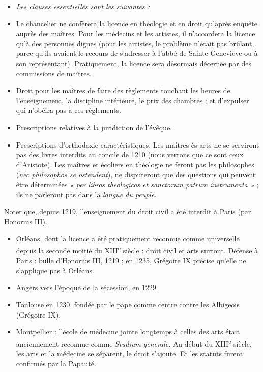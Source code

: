 \documentclass[french,twoside]{book} %
\newlength{\listmod}
\newcommand{\listhead}[1]{\hspace{-1\listmod}\emph{#1}}
\begin{document}
\begin{itemize}[itemsep=0pt,]
\item[]\listhead{Les clauses essentielles sont les suivantes :}
\item Le chancelier ne confèrera la licence en théologie et en droit qu’après enquête auprès des maîtres. Pour les médecins et les artistes, il n’accordera la licence qu’à des personnes dignes (pour les artistes, le problème n’était pas brûlant, parce qu’ils avaient le recours de s’adresser à l’abbé de Sainte-Geneviève ou à son représentant). Pratiquement, la licence sera désormais décernée par des commissions de maîtres.
\item Droit pour les maîtres de faire des règlements touchant les heures de l’enseignement, la discipline intérieure, le prix des chambres ; et d’expulser qui n’obéira pas à ces règlements.
\item Prescriptions relatives à la juridiction de l’évêque.
\item Prescriptions d’orthodoxie caractéristiques. Les maîtres ès arts ne se serviront pas des livres interdits au concile de 1210 (nous verrons que ce sont ceux d’Aristote). Les maîtres et écoliers en théologie ne feront pas les philosophes ({\itshape nec philosophos se ostendent}), ne disputeront que des questions qui peuvent être déterminées \emph{« per libros theologicos et sanctorum patrum instrumenta »} ; ils ne parleront pas dans la \emph{langue du peuple}.
\end{itemize}
\noindent Noter que, depuis 1219, l’enseignement du droit civil a été interdit à Paris (par Honorius III).\par

\begin{itemize}[itemsep=0pt,]
\item Orléans, dont la licence a été pratiquement reconnue comme universelle depuis la seconde moitié du XIII\textsuperscript{e} siècle : droit civil et  
\label{p117} arts surtout. Défense à Paris : bulle d’Honorius III, 1219 ; en 1235, Grégoire IX précise qu’elle ne s’applique pas à Orléans.
\item Angers vers l’époque de la sécession, en 1229.
\item Toulouse en 1230, fondée par le pape comme centre contre les Albigeois (Grégoire IX).
\item Montpellier : l’école de médecine jointe longtemps à celles des arts était anciennement reconnue comme {\itshape Studium generale.} Au début du XIII\textsuperscript{e} siècle, les arts et la médecine se séparent, le droit s’ajoute. Et les statuts furent confirmés par la Papauté.
\end{itemize}
\end{document}
